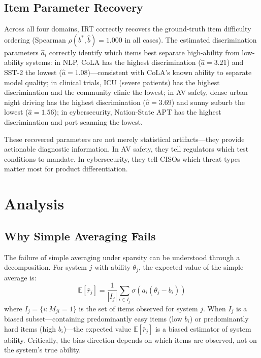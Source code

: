 \documentclass[11pt,a4paper]{article}
\begin{document}
\subsection{Item Parameter Recovery}

Across all four domains, IRT correctly recovers the ground-truth item difficulty ordering (Spearman $\rho(b^*, \hat{b}) = 1.000$ in all cases). The estimated discrimination parameters $\hat{a}_i$ correctly identify which items best separate high-ability from low-ability systems: in NLP, CoLA has the highest discrimination ($\hat{a} = 3.21$) and SST-2 the lowest ($\hat{a} = 1.08$)---consistent with CoLA's known ability to separate model quality; in clinical trials, ICU (severe patients) has the highest discrimination and the community clinic the lowest; in AV safety, dense urban night driving has the highest discrimination ($\hat{a} = 3.69$) and sunny suburb the lowest ($\hat{a} = 1.56$); in cybersecurity, Nation-State APT has the highest discrimination and port scanning the lowest.

These recovered parameters are not merely statistical artifacts---they provide actionable diagnostic information. In AV safety, they tell regulators which test conditions to mandate. In cybersecurity, they tell CISOs which threat types matter most for product differentiation.

\section{Analysis}

\subsection{Why Simple Averaging Fails}

The failure of simple averaging under sparsity can be understood through a decomposition. For system $j$ with ability $\theta_j$, the expected value of the simple average is:
\begin{equation}
\mathbb{E}[\bar{r}_j] = \frac{1}{|I_j|} \sum_{i \in I_j} \sigma(a_i(\theta_j - b_i))
\end{equation}
where $I_j = \{i : M_{ji} = 1\}$ is the set of items observed for system $j$. When $I_j$ is a biased subset---containing predominantly easy items (low $b_i$) or predominantly hard items (high $b_i$)---the expected value $\mathbb{E}[\bar{r}_j]$ is a biased estimator of system ability. Critically, the bias direction depends on which items are observed, not on the system's true ability.
\end{document}
